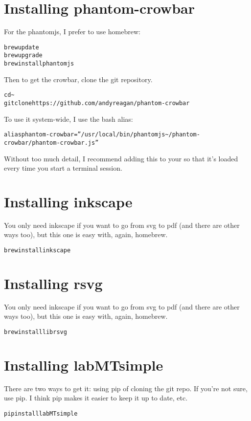 \documentclass[letterpaper,10pt,english]{sphinxmanual}
\begin{document}
\section{Installing phantom-crowbar}
\label{wordshifts:installing-phantom-crowbar}
For the phantomjs, I prefer to use homebrew:
\begin{alltt}
brew update
brew upgrade
brew install phantomjs
\end{alltt}

Then to get the crowbar, clone the git repository.
\begin{alltt}
cd \textasciitilde{}
git clone https://github.com/andyreagan/phantom-crowbar
\end{alltt}

To use it system-wide, I use the bash alias:
\begin{alltt}
alias phantom-crowbar=''/usr/local/bin/phantomjs \textasciitilde{}/phantom-crowbar/phantom-crowbar.js''
\end{alltt}

Without too much detail, I recommend adding this to your  so that it's loaded every time you start a terminal session.


\section{Installing inkscape}
\label{wordshifts:installing-inkscape}
You only need inkscape if you want to go from svg to pdf (and there are other ways too), but this one is easy with, again, homebrew.
\begin{alltt}
brew install inkscape
\end{alltt}


\section{Installing rsvg}
\label{wordshifts:installing-rsvg}
You only need inkscape if you want to go from svg to pdf (and there are other ways too), but this one is easy with, again, homebrew.
\begin{alltt}
brew install librsvg
\end{alltt}


\section{Installing labMTsimple}
\label{wordshifts:installing-labmtsimple}
There are two ways to get it: using pip of cloning the git repo.
If you're not sure, use pip.
I think pip makes it easier to keep it up to date, etc.
\begin{alltt}
pip install labMTsimple
\end{alltt}
\end{document}
